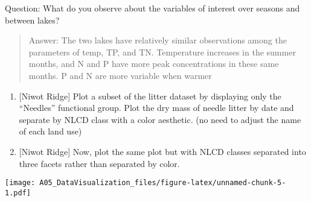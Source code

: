 \documentclass[]{article}
\newenvironment{Shaded}{\begin{snugshade}}{\end{snugshade}}
\newcommand{\CommentTok}[1]{\textcolor[rgb]{0.56,0.35,0.01}{\textit{#1}}}
\newcommand{\DataTypeTok}[1]{\textcolor[rgb]{0.13,0.29,0.53}{#1}}
\newcommand{\DecValTok}[1]{\textcolor[rgb]{0.00,0.00,0.81}{#1}}
\newcommand{\KeywordTok}[1]{\textcolor[rgb]{0.13,0.29,0.53}{\textbf{#1}}}
\newcommand{\NormalTok}[1]{#1}
\newcommand{\OperatorTok}[1]{\textcolor[rgb]{0.81,0.36,0.00}{\textbf{#1}}}
\newcommand{\StringTok}[1]{\textcolor[rgb]{0.31,0.60,0.02}{#1}}
\begin{document}
Question: What do you observe about the variables of interest over
seasons and between lakes?

\begin{quote}
Answer: The two lakes have relatively similar observations among the
parameters of temp, TP, and TN. Temperature increases in the summer
months, and N and P have more peak concentrations in these same months.
P and N are more variable when warmer
\end{quote}

\begin{enumerate}
\def\labelenumi{\arabic{enumi}.}
\setcounter{enumi}{5}
\item
  {[}Niwot Ridge{]} Plot a subset of the litter dataset by displaying
  only the ``Needles'' functional group. Plot the dry mass of needle
  litter by date and separate by NLCD class with a color aesthetic. (no
  need to adjust the name of each land use)
\item
  {[}Niwot Ridge{]} Now, plot the same plot but with NLCD classes
  separated into three facets rather than separated by color.
\end{enumerate}

\begin{Shaded}
\end{Shaded}

\texttt{[image: A05\_DataVisualization\_files/figure-latex/unnamed-chunk-5-1.pdf]}

\begin{Shaded}
\end{Shaded}
\end{document}

